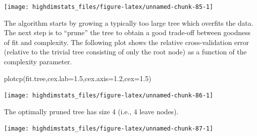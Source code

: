 \documentclass[
]{book}
\newenvironment{Shaded}{\begin{snugshade}}{\end{snugshade}}
\newcommand{\AttributeTok}[1]{\textcolor[rgb]{0.77,0.63,0.00}{#1}}
\newcommand{\CommentTok}[1]{\textcolor[rgb]{0.56,0.35,0.01}{\textit{#1}}}
\newcommand{\DecValTok}[1]{\textcolor[rgb]{0.00,0.00,0.81}{#1}}
\newcommand{\FloatTok}[1]{\textcolor[rgb]{0.00,0.00,0.81}{#1}}
\newcommand{\FunctionTok}[1]{\textcolor[rgb]{0.00,0.00,0.00}{#1}}
\newcommand{\NormalTok}[1]{#1}
\newcommand{\OtherTok}[1]{\textcolor[rgb]{0.56,0.35,0.01}{#1}}
\newcommand{\SpecialCharTok}[1]{\textcolor[rgb]{0.00,0.00,0.00}{#1}}
\newcommand{\StringTok}[1]{\textcolor[rgb]{0.31,0.60,0.02}{#1}}
\begin{document}
\begin{center}\texttt{[image: highdimstats\_files/figure-latex/unnamed-chunk-85-1]} \end{center}

The algorithm starts by growing a typically too large tree which overfits the data. The next step is to ``prune'' the tree to obtain a good trade-off between goodness of fit and complexity. The following plot shows the relative cross-validation error (relative to the trivial tree consisting of only the root node) as a function of the complexity parameter.

\begin{Shaded}
\begin{Highlighting}[]
\FunctionTok{plotcp}\NormalTok{(fit.tree,}\AttributeTok{cex.lab=}\FloatTok{1.5}\NormalTok{,}\AttributeTok{cex.axis=}\FloatTok{1.2}\NormalTok{,}\AttributeTok{cex=}\FloatTok{1.5}\NormalTok{)}
\end{Highlighting}
\end{Shaded}

\begin{center}\texttt{[image: highdimstats\_files/figure-latex/unnamed-chunk-86-1]} \end{center}

The optimally pruned tree has size 4 (i.e., 4 leave nodes).

\begin{Shaded}
\end{Shaded}

\begin{center}\texttt{[image: highdimstats\_files/figure-latex/unnamed-chunk-87-1]} \end{center}
\end{document}
